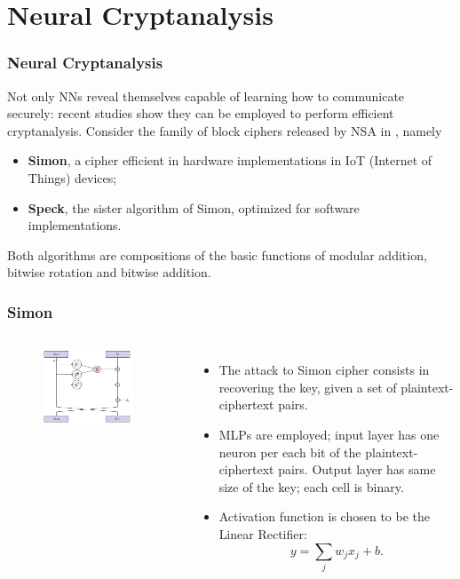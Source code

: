 \documentclass{beamer}
\begin{document}
\section{Neural Cryptanalysis}
\begin{frame}
\frametitle{Neural Cryptanalysis}
Not only NNs reveal themselves capable of learning how to communicate securely: recent studies show they can be employed
to perform efficient cryptanalysis. Consider the family of block ciphers released by NSA in \cite{nsa}, namely
\begin{itemize}
\item \textbf{Simon}, a cipher efficient in hardware implementations in IoT (Internet of Things) devices;
\item \textbf{Speck}, the sister algorithm of Simon, optimized for software implementations.
\end{itemize}
Both algorithms are compositions of the basic functions of modular addition, bitwise rotation and bitwise addition.
\end{frame}

\begin{frame}
\frametitle{Simon}
\begin{columns}[c]
\begin{figure}
\includegraphics[width = 0.9\textwidth]{"pictures/simon.png"}
\end{figure}
\begin{itemize}
\item The attack to Simon cipher consists in recovering the key, given a set of plaintext-ciphertext pairs.
\item MLPs are employed; input layer has one neuron per each bit of the plaintext-ciphertext pairs. Output layer has same size of the key; each cell is binary.
\item Activation function is chosen to be the Linear Rectifier:
	\begin{equation*}
	y = \sum_{j}w_j x_j + b.
	\end{equation*}
\end{itemize}
\end{columns}
\end{frame}
\end{document}
